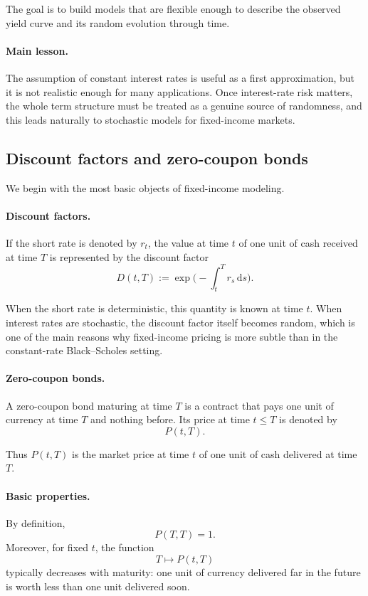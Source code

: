 \documentclass[11pt]{article}
\theoremstyle{plain}
\theoremstyle{definition}
\theoremstyle{remark}
\begin{document}
The goal is to build models that are flexible enough to describe the
observed yield curve and its random evolution through time.

\paragraph{Main lesson.}

The assumption of constant interest rates is useful as a first
approximation, but it is not realistic enough for many applications.
Once interest-rate risk matters, the whole term structure must be
treated as a genuine source of randomness, and this leads naturally to
stochastic models for fixed-income markets.
\subsection{Discount factors and zero-coupon bonds}

We begin with the most basic objects of fixed-income modeling.

\paragraph{Discount factors.}
If the short rate is denoted by \(r_t\), the value at time \(t\) of one
unit of cash received at time \(T\) is represented by the discount
factor
\[
D(t,T):=\exp\!\Big(-\int_t^T r_s\,\mathrm{d}s\Big).
\]

When the short rate is deterministic, this quantity is known at time
\(t\).
When interest rates are stochastic, the discount factor itself becomes
random, which is one of the main reasons why fixed-income pricing is
more subtle than in the constant-rate Black--Scholes setting.

\paragraph{Zero-coupon bonds.}
A zero-coupon bond maturing at time \(T\) is a contract that pays one
unit of currency at time \(T\) and nothing before.
Its price at time \(t\le T\) is denoted by
\[
P(t,T).
\]

Thus \(P(t,T)\) is the market price at time \(t\) of one unit of cash
delivered at time \(T\).

\paragraph{Basic properties.}
By definition,
\[
P(T,T)=1.
\]
Moreover, for fixed \(t\), the function
\[
T\longmapsto P(t,T)
\]
typically decreases with maturity: one unit of currency delivered far in
the future is worth less than one unit delivered soon.
\end{document}

